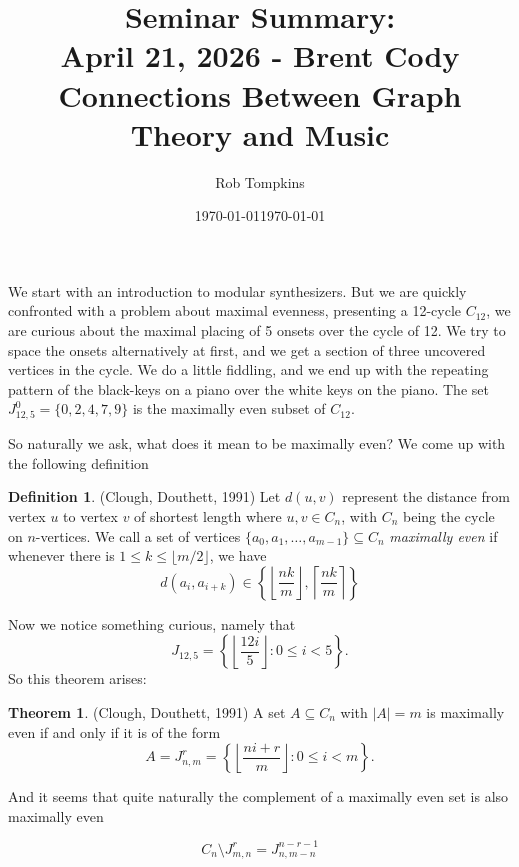 \documentclass[12pt]{amsart}
\title{Seminar Summary:\\April 21, 2026 - Brent Cody\\Connections Between Graph Theory and Music}
\author{Rob Tompkins}
\date{\today}
\theoremstyle{conjecture}
\theoremstyle{definition}
\newtheorem{definition}{Definition}
\theoremstyle{question}
\theoremstyle{theorem}
\newtheorem{theorem}{Theorem}
\begin{document}
    \maketitle
    \date{\today}
    \begin{onehalfspace}
        We start with an introduction to modular synthesizers.
        But we are quickly confronted with a problem about maximal evenness, presenting a 12-cycle $C_{12}$, we are
        curious about the maximal placing of 5 onsets over the cycle of 12.
        We try to space the onsets alternatively at first, and we get a section of three uncovered vertices in the cycle.
        We do a little fiddling, and we end up with the repeating pattern of the black-keys on a piano over the white
        keys on the piano.
        The set $J_{12,5}^0 = \{0,2,4,7,9\}$ is the maximally even subset of $C_{12}$.

        So naturally we ask, what does it mean to be maximally even?
        We come up with the following definition
        \begin{definition}
            (Clough, Douthett, 1991) Let $d(u,v)$ represent the distance from vertex $u$ to vertex $v$ of shortest length where $u,v\in C_n$,
            with $C_n$ being the cycle on $n$-vertices.
            We call a set of vertices $\{a_0,a_1,\ldots, a_{m-1}\}\subseteq C_n$ \emph{maximally even} if whenever there is
            $1\le k \le \lfloor m/2 \rfloor$, we have
            \[
                d(a_i, a_{i+k}) \in \left\{ \left\lfloor \frac{nk}{m} \right\rfloor, \left\lceil \frac{nk}{m}\right\rceil \right\}
            \]
        \end{definition}
        Now we notice something curious, namely that
        \[
            J_{12,5} = \left\{\left\lfloor\frac{12i}{5}\right\rfloor: 0\le i< 5\right\}.
        \]
        So this theorem arises:
        \begin{theorem}
            (Clough, Douthett, 1991) A set $A \subseteq C_n$ with $|A| = m$ is maximally even if and only if it is
            of the form
            \begin{displaymath}
                A = J_{n,m}^r = \left\{ \left\lfloor\frac{ni+r}{m}\right\rfloor: 0 \le i < m\right\}.
            \end{displaymath}
        \end{theorem}

        And it seems that quite naturally the complement of a maximally even set is also maximally even

        \[
            C_n \setminus J_{m,n}^r = J_{n,m-n}^{n-r-1}
        \]


\end{onehalfspace}
\end{document}
